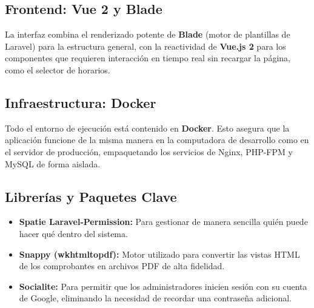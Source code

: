 \subsection{Frontend: Vue 2 y Blade}
La interfaz combina el renderizado potente de \textbf{Blade} (motor de plantillas de Laravel) para la estructura general, con la reactividad de \textbf{Vue.js 2} para los componentes que requieren interacción en tiempo real sin recargar la página, como el selector de horarios.

\subsection{Infraestructura: Docker}
Todo el entorno de ejecución está contenido en \textbf{Docker}. Esto asegura que la aplicación funcione de la misma manera en la computadora de desarrollo como en el servidor de producción, empaquetando los servicios de Nginx, PHP-FPM y MySQL de forma aislada.

\subsection{Librerías y Paquetes Clave}
\begin{itemize}
    \item \textbf{Spatie Laravel-Permission:} Para gestionar de manera sencilla quién puede hacer qué dentro del sistema.
    \item \textbf{Snappy (wkhtmltopdf):} Motor utilizado para convertir las vistas HTML de los comprobantes en archivos PDF de alta fidelidad.
    \item \textbf{Socialite:} Para permitir que los administradores inicien sesión con su cuenta de Google, eliminando la necesidad de recordar una contraseña adicional.
\end{itemize}

